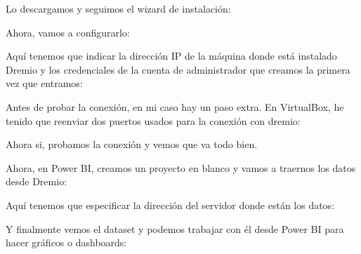 \documentclass{../../../miPlantilla}
\begin{document}

\newpage

Lo descargamos y seguimos el wizard de instalación:


Ahora, vamos a configurarlo:


Aquí tenemos que indicar la dirección IP de la máquina donde está instalado Dremio y los credenciales de la cuenta de administrador que creamos
la primera vez que entramos:


Antes de probar la conexión, en mi caso hay un paso extra. En VirtualBox, he tenido que reenviar dos puertos usados para la conexión con dremio:


Ahora si, probamos la conexión y vemos que va todo bien.


Ahora, en Power BI, creamos un proyecto en blanco y vamos a traernos los datos desde Dremio:


Aquí tenemos que especificar la dirección del servidor donde están los datos:


\newpage

Y finalmente vemos el dataset y podemos trabajar con él desde Power BI para hacer gráficos o dashboards:

\end{document}
